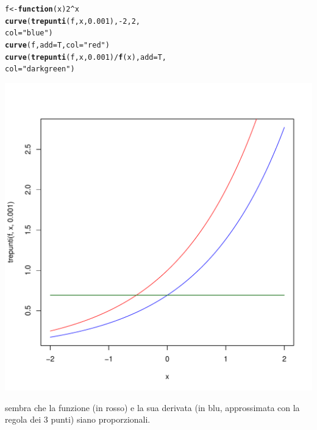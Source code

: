 \documentclass[onecolumn,11pt]{book}\usepackage[]{graphicx}\usepackage[]{color}
\makeatletter
\def\maxwidth{ %
  \ifdim\Gin@nat@width>\linewidth
    \linewidth
  \else
    \Gin@nat@width
  \fi
}
\newcommand{\hlnum}[1]{\textcolor[rgb]{0.686,0.059,0.569}{#1}}%
\newcommand{\hlstr}[1]{\textcolor[rgb]{0.192,0.494,0.8}{#1}}%
\newcommand{\hlopt}[1]{\textcolor[rgb]{0,0,0}{#1}}%
\newcommand{\hlstd}[1]{\textcolor[rgb]{0.345,0.345,0.345}{#1}}%
\newcommand{\hlkwa}[1]{\textcolor[rgb]{0.161,0.373,0.58}{\textbf{#1}}}%
\newcommand{\hlkwb}[1]{\textcolor[rgb]{0.69,0.353,0.396}{#1}}%
\newcommand{\hlkwc}[1]{\textcolor[rgb]{0.333,0.667,0.333}{#1}}%
\newcommand{\hlkwd}[1]{\textcolor[rgb]{0.737,0.353,0.396}{\textbf{#1}}}%
\newenvironment{kframe}{%
 \def\at@end@of@kframe{}%
 \ifinner\ifhmode%
  \def\at@end@of@kframe{\end{minipage}}%
  \begin{minipage}{\columnwidth}%
 \fi\fi%
 \def\FrameCommand##1{\hskip\@totalleftmargin \hskip-\fboxsep
 \colorbox{shadecolor}{##1}\hskip-\fboxsep
     \hskip-\linewidth \hskip-\@totalleftmargin \hskip\columnwidth}%
 \MakeFramed {\advance\hsize-\width
   \@totalleftmargin\z@ \linewidth\hsize
   \@setminipage}}%
 {\par\unskip\endMakeFramed%
 \at@end@of@kframe}
\newenvironment{knitrout}{}{} %
\makeatother
\begin{document}
\begin{knitrout}
\color{fgcolor}\begin{kframe}
\begin{alltt}
\hlstd{f}\hlkwb{<-}\hlkwa{function}\hlstd{(}\hlkwc{x}\hlstd{)} \hlnum{2}\hlopt{^}\hlstd{x}
\hlkwd{curve}\hlstd{(}\hlkwd{trepunti}\hlstd{(f,x,}\hlnum{0.001}\hlstd{),}\hlopt{-}\hlnum{2}\hlstd{,}\hlnum{2}\hlstd{,}
\hlkwc{col}\hlstd{=}\hlstr{"blue"}\hlstd{)}
\hlkwd{curve}\hlstd{(f,}\hlkwc{add}\hlstd{=T,}\hlkwc{col}\hlstd{=}\hlstr{"red"}\hlstd{)}
\hlkwd{curve}\hlstd{(}\hlkwd{trepunti}\hlstd{(f,x,}\hlnum{0.001}\hlstd{)}\hlopt{/}\hlkwd{f}\hlstd{(x),}\hlkwc{add}\hlstd{=T,}
\hlkwc{col}\hlstd{=}\hlstr{"dark green"}\hlstd{)}
\end{alltt}
\end{kframe}
\includegraphics[width=\maxwidth]{figure/unnamed-chunk-120-1} 

\end{knitrout}
sembra che  la funzione (in rosso) e la sua derivata (in blu, approssimata con la regola dei 3 punti)   siano proporzionali.
\end{document}
